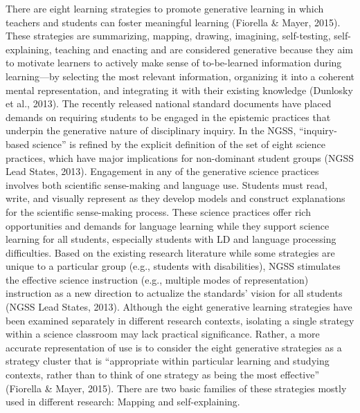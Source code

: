 \documentclass[11.5pt]{sig-alternate} %
\begin{document}
\begin{large}
There are eight learning strategies to promote generative learning in which teachers and students can foster meaningful learning (Fiorella \& Mayer, 2015). These strategies are summarizing, mapping, drawing, imagining, self-testing, self-explaining, teaching and enacting and are considered generative because they aim to motivate learners to actively make sense of to-be-learned information during learning—by selecting the most relevant information, organizing it into a coherent mental representation, and integrating it with their existing knowledge (Dunlosky et al., 2013). The recently released national standard documents have placed demands on requiring students to be engaged in the epistemic practices that underpin the generative nature of disciplinary inquiry. In the NGSS, “inquiry-based science” is refined by the explicit definition of the set of eight science practices, which have major implications for non-dominant student groups (NGSS Lead States, 2013). Engagement in any of the generative science practices involves both scientific sense-making and language use. Students must read, write, and visually represent as they develop models and construct explanations for the scientific sense-making process. These science practices offer rich opportunities and demands for language learning while they support science learning for all students, especially students with LD and language processing difficulties. Based on the existing research literature while some strategies are unique to a particular group (e.g., students with disabilities), NGSS stimulates the effective science instruction (e.g., multiple modes of representation) instruction as a new direction to actualize the standards’ vision for all students (NGSS Lead States, 2013). Although the eight generative learning strategies have been examined separately in different research contexts, isolating a single strategy within a science classroom may lack practical significance. Rather, a more accurate representation of use is to consider the eight generative strategies as a strategy cluster that is “appropriate within particular learning and studying contexts, rather than to think of one strategy as being the most effective” (Fiorella \& Mayer, 2015). There are two basic families of these strategies mostly used in different research: Mapping and self-explaining.


\end{large}
\end{document}
